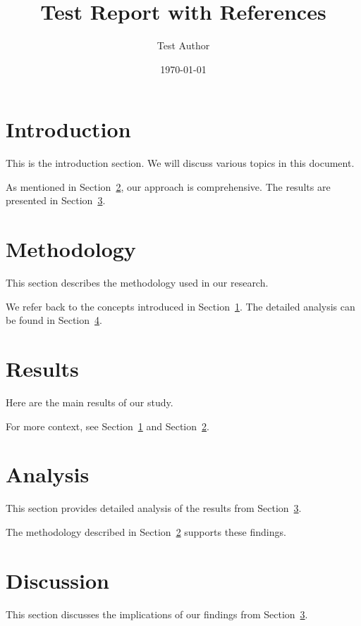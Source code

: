 \documentclass{article}
\title{Test Report with References}
\author{Test Author}
\date{\today}
\begin{document}
\maketitle

\tableofcontents

\section{Introduction}
\label{sec:introduction}

This is the introduction section. We will discuss various topics in this document.

As mentioned in Section~\ref{sec:methodology}, our approach is comprehensive.
The results are presented in Section~\ref{sec:results}.

\section{Methodology}
\label{sec:methodology}

This section describes the methodology used in our research.

We refer back to the concepts introduced in Section~\ref{sec:introduction}.
The detailed analysis can be found in Section~\ref{sec:analysis}.

\section{Results}
\label{sec:results}

Here are the main results of our study.

For more context, see Section~\ref{sec:introduction} and Section~\ref{sec:methodology}.

\section{Analysis}
\label{sec:analysis}

This section provides detailed analysis of the results from Section~\ref{sec:results}.

The methodology described in Section~\ref{sec:methodology} supports these findings.

\section{Discussion}
\label{sec:discussion}

This section discusses the implications of our findings from Section~\ref{sec:results}.
\end{document}
